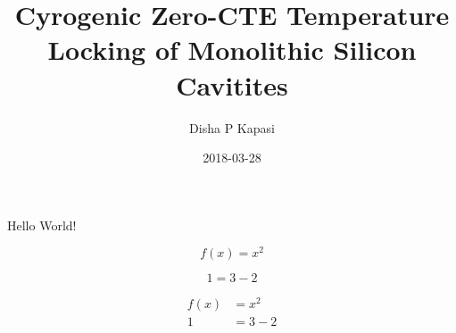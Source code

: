 \documentclass{article}
\title{Cyrogenic Zero-CTE Temperature Locking of Monolithic Silicon Cavitites}
\date{2018-03-28}
\author{Disha P Kapasi}
\begin{document}
    \maketitle
    \newpage
	Hello World!
	
	\begin{equation}
	f(x)=x^2
	\end{equation}
	
	\begin{equation}
	1 = 3-2
	\end{equation}
	
	\begin{align}
	f(x)& = x^2 \\
	1 &= 3-2
	\end{align}
\end{document}
